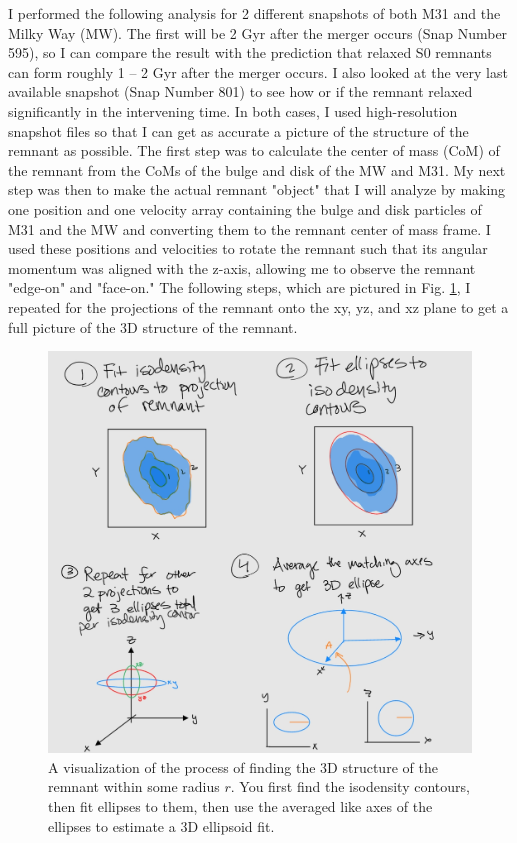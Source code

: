 \documentclass[twocolumn]{aastex631}
\begin{document}
I performed the following analysis for 2 different snapshots of both M31 and the Milky Way (MW). 
The first will be 2 Gyr after the merger occurs (Snap Number 595), so I can compare the result with the prediction that relaxed S0 remnants can form roughly 1 -- 2 Gyr after the merger occurs.
I also looked at the very last available snapshot (Snap Number 801) to see how or if the remnant relaxed significantly in the intervening time.
In both cases, I used high-resolution snapshot files so that I can get as accurate a picture of the structure of the remnant as possible.
The first step was to calculate the center of mass (CoM) of the remnant from the CoMs of the bulge and disk of the MW and M31. 
My next step was then to make the actual remnant "object" that I will analyze by making one position and one velocity array containing the bulge and disk particles of M31 and the MW and converting them to the remnant center of mass frame. 
I used these positions and velocities to rotate the remnant such that its angular momentum was aligned with the z-axis, allowing me to observe the remnant "edge-on" and "face-on."
The following steps, which are pictured in Fig. \ref{fig:methods}, I repeated for the projections of the remnant onto the xy, yz, and xz plane to get a full picture of the 3D structure of the remnant.
\begin{figure}[h!]
    \centering
    \includegraphics[width=\linewidth]{Methods.jpg}
    \caption{
        A visualization of the process of finding the 3D structure of the remnant within some radius $r$. You first find the isodensity contours, then fit ellipses to them, then use the averaged like axes of the ellipses to estimate a 3D ellipsoid fit.
    }
    \label{fig:methods}
\end{figure}
\end{document}
